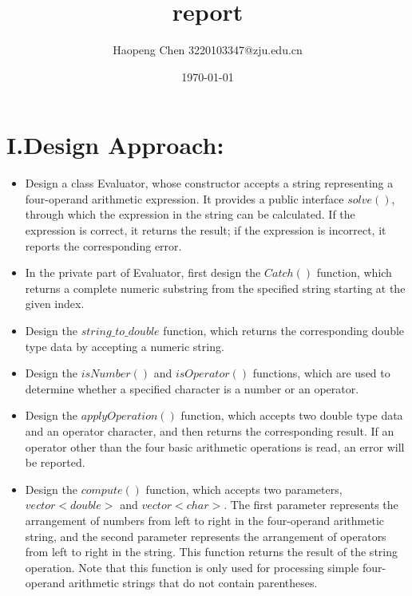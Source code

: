 \documentclass[a4paper]{article}
\begin{document}
\title{report}
\author{Haopeng Chen 3220103347@zju.edu.cn}
\date{\today}
\maketitle
\section*{I.Design Approach:}
\begin{itemize}
\item Design a class Evaluator, whose constructor accepts a string representing a four-operand arithmetic expression. It provides a public interface $solve()$, through which the expression in the string can be calculated. If the expression is correct, it returns the result; if the expression is incorrect, it reports the corresponding error.

\item In the private part of Evaluator, first design the $Catch()$ function, which returns a complete numeric substring from the specified string starting at the given index.

\item Design the $string\_to\_double$ function, which returns the corresponding double type data by accepting a numeric string.

\item Design the $isNumber()$ and $isOperator()$ functions, which are used to determine whether a specified character is a number or an operator.

\item Design the $applyOperation()$ function, which accepts two double type data and an operator character, and then returns the corresponding result. If an operator other than the four basic arithmetic operations is read, an error will be reported.

\item Design the $compute()$ function, which accepts two parameters, $vector<double>$ and $vector<char>$. The first parameter represents the arrangement of numbers from left to right in the four-operand arithmetic string, and the second parameter represents the arrangement of operators from left to right in the string. This function returns the result of the string operation. Note that this function is only used for processing simple four-operand arithmetic strings that do not contain parentheses.


\end{itemize}
\end{document}
